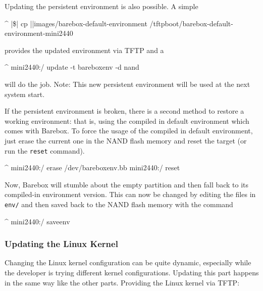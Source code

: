 
Updating the persistent environment is also possible. A simple

\begin{ptxshell}[escapechar=|]{^}
|\$| cp |\ptxdistPlatformDir |images/barebox-default-environment /tftpboot/barebox-default-environment-mini2440
\end{ptxshell}

provides the updated environment via TFTP and a

\begin{ptxshell}[escapechar=|]{^}
mini2440:/ update -t bareboxenv -d nand
\end{ptxshell}

will do the job. Note: This new persistent environment will be used at the next
system start.

If the persistent environment is broken, there is a second method to restore a
working environment: that is, using the compiled in default environment which
comes with Barebox.
To force the usage of the compiled in default environment, just erase the
current one in the NAND flash memory and reset the target (or run the
\texttt{reset} command).

\begin{ptxshell}[escapechar=|]{^}
mini2440:/ erase /dev/bareboxenv.bb
mini2440:/ reset
\end{ptxshell}

Now, Barebox will stumble about the empty partition and then fall back to its
compiled-in environment version. This can now be changed by editing the files
in \texttt{env/} and then saved back to the NAND flash memory with the command

\begin{ptxshell}[escapechar=|]{^}
mini2440:/ saveenv
\end{ptxshell}

\subsubsection{Updating the Linux Kernel}

Changing the Linux kernel configuration can be quite dynamic, especially while
the developer is trying different kernel configurations. Updating this part
happens in the same way like the other parts. Providing the Linux kernel via
TFTP:

